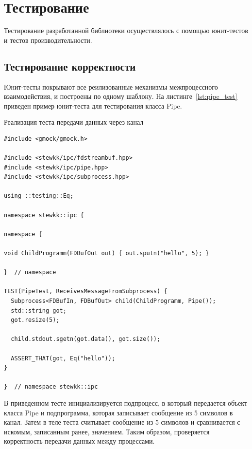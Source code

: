 \documentclass[14pt, russian]{scrartcl}
\begin{document}
\section{Тестирование}

Тестирование разработанной библиотеки осуществлялось с помощью юнит-тестов и
тестов производительности.

\subsection{Тестирование корректности}

Юнит-тесты покрывают все реилизованные механизмы межпроцессного взаимодействия,
и построены по одному шаблону. На листинге~\ref{lst:pipe_test} приведен пример
юнит-теста для тестирования класса Pipe.

\begin{listing}[H]
  \caption{Реализация теста передачи данных через канал}
  \label{lst:pipe_test}
  \begin{verbatim}
#include <gmock/gmock.h>

#include <stewkk/ipc/fdstreambuf.hpp>
#include <stewkk/ipc/pipe.hpp>
#include <stewkk/ipc/subprocess.hpp>

using ::testing::Eq;

namespace stewkk::ipc {

namespace {

void ChildProgramm(FDBufOut out) { out.sputn("hello", 5); }

}  // namespace

TEST(PipeTest, ReceivesMessageFromSubprocess) {
  Subprocess<FDBufIn, FDBufOut> child(ChildProgramm, Pipe());
  std::string got;
  got.resize(5);

  child.stdout.sgetn(got.data(), got.size());

  ASSERT_THAT(got, Eq("hello"));
}

}  // namespace stewkk::ipc
  \end{verbatim}
\end{listing}

В приведенном тесте инициализируется подпроцесс, в который передается объект
класса Pipe и подпрограмма, которая записывает сообщение из 5 символов в канал.
Затем в теле теста считывает сообщение из 5 символов и сравнивается с искомым,
записанным ранее, значением. Таким образом, проверяется корректность передачи
данных между процессами.
\end{document}
